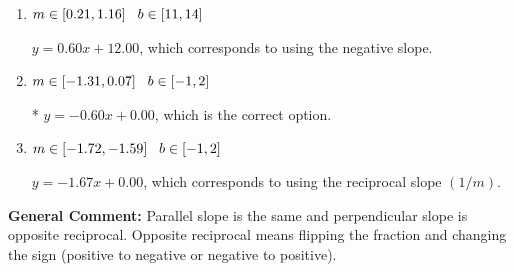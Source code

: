 \documentclass{extbook}[14pt]
\begin{document}
\begin{enumerate}
{\begin{enumerate}[label=\Alph*.]
 $y = -0.60x + 16.00$, which corresponds to correct slope and mis-distributing while simplifying to slope-intercept form.
\item \( m \in [0.21, 1.16] \hspace*{3mm} b \in [11, 14] \)

 $y = 0.60x + 12.00$, which corresponds to using the negative slope.
\item \( m \in [-1.31, 0.07] \hspace*{3mm} b \in [-1, 2] \)

* $y = -0.60x + 0.00$, which is the correct option.
\item \( m \in [-1.72, -1.59] \hspace*{3mm} b \in [-1, 2] \)

 $y = -1.67x + 0.00$, which corresponds to using the reciprocal slope $(1/m)$.
\end{enumerate}

\textbf{General Comment:} Parallel slope is the same and perpendicular slope is opposite reciprocal. Opposite reciprocal means flipping the fraction and changing the sign (positive to negative or negative to positive).
}
\end{enumerate}
\end{document}
